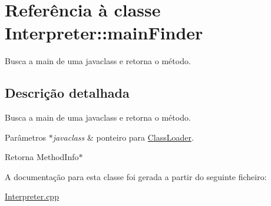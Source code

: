 \hypertarget{class_interpreter_1_1main_finder}{}\section{Referência à classe Interpreter\+:\+:main\+Finder}
\label{class_interpreter_1_1main_finder}


Busca a main de uma javaclass e retorna o método.  




\subsection{Descrição detalhada}
Busca a main de uma javaclass e retorna o método. 


\begin{DoxyParams}{Parâmetros}
{\em $\ast$javaclass} & ponteiro para \hyperlink{class_class_loader}{Class\+Loader}. \\
\hline
\end{DoxyParams}
\begin{DoxyReturn}{Retorna}
Method\+Info$\ast$ 
\end{DoxyReturn}


A documentação para esta classe foi gerada a partir do seguinte ficheiro\+:\begin{DoxyCompactItemize}
\item 
\hyperlink{_interpreter_8cpp}{Interpreter.\+cpp}\end{DoxyCompactItemize}
